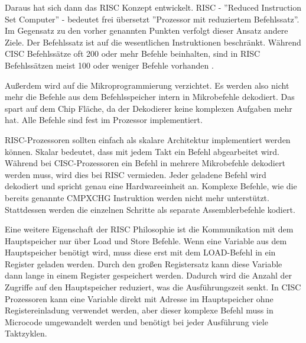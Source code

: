 \documentclass[a4paper,12pt]{article}
\begin{document}
\par \bigskip
\noindent Daraus hat sich dann das RISC Konzept entwickelt. RISC - ''Reduced Instruction Set Computer'' - bedeutet frei übersetzt ''Prozessor mit reduziertem Befehlssatz''. Im Gegensatz zu den vorher genannten Punkten verfolgt dieser Ansatz andere Ziele. Der Befehlssatz ist auf die wesentlichen Instruktionen beschränkt. Während CISC Befehlssätze oft 200 oder mehr Befehle beinhalten, sind in RISC Befehlssätzen meist 100 oder weniger Befehle vorhanden \cite[S. 85]{TaschenbuchMikroprozessortechnik}.
\par \bigskip
\noindent Außerdem wird auf die Mikroprogrammierung verzichtet. Es werden also nicht mehr die Befehle aus dem Befehlsspeicher intern in Mikrobefehle dekodiert. Das spart auf dem Chip Fläche, da der Dekodierer keine komplexen Aufgaben mehr hat. Alle Befehle sind fest im Prozessor implementiert.
\par \bigskip
\noindent RISC-Prozessoren sollten einfach als skalare Architektur implementiert werden können. Skalar bedeutet, dass mit jedem Takt ein Befehl abgearbeitet wird. Während bei CISC-Prozessoren ein Befehl in mehrere Mikrobefehle dekodiert werden muss, wird dies bei RISC vermieden. Jeder geladene Befehl wird dekodiert und spricht genau eine Hardwareeinheit an. Komplexe Befehle, wie die bereits genannte CMPXCHG Instruktion werden nicht mehr unterstützt. Stattdessen werden die einzelnen Schritte als separate Assemblerbefehle kodiert. 

\noindent Eine weitere Eigenschaft der RISC Philosophie ist die Kommunikation mit dem Hauptspeicher nur über Load und Store Befehle. Wenn eine Variable aus dem Hauptspeicher benötigt wird, muss diese erst mit dem LOAD-Befehl in ein Register geladen werden. Durch den großen Registersatz kann diese Variable dann lange in einem Register gespeichert werden. Dadurch wird die Anzahl der Zugriffe auf den Hauptspeicher reduziert, was die Ausführungszeit senkt. In CISC Prozessoren kann eine Variable direkt mit Adresse im Hauptspeicher ohne Registereinladung verwendet werden, aber dieser komplexe Befehl muss in Microcode umgewandelt werden und benötigt bei jeder Ausführung viele Taktzyklen.\cite[S.102]{mikroprozessortechnik2011}
\end{document}
